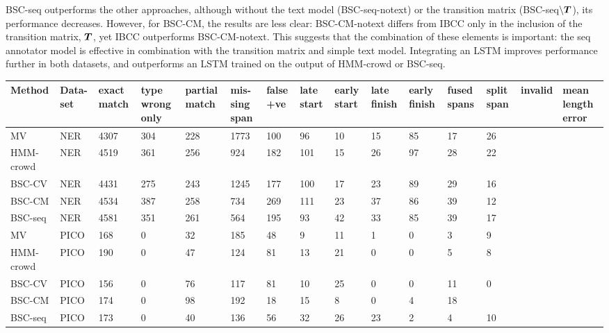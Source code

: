 BSC-seq outperforms the other approaches, although 
without the text model (BSC-seq-notext) or the transition matrix (BSC-seq$\backslash\boldsymbol T$),
its performance decreases.
However, for BSC-CM, the results are less clear: BSC-CM-notext differs from IBCC only in the 
inclusion of the transition matrix, $\boldsymbol T$, yet IBCC outperforms BSC-CM-notext.
This suggests that the combination of these elements is important: the seq annotator model is effective 
in combination with the transition matrix and simple text model.
Integrating an LSTM improves performance further in both datasets, and outperforms an LSTM trained on the output of HMM-crowd or BSC-seq.

\begin{table}[h]
\small
\begin{tabularx}{\textwidth}{l X X X X X X X X X X X X X X}
\toprule
Method & Data-set & exact match & type wrong only & partial match & mis-sing span & false +ve & late start & early start & late finish & early finish & fused spans & split span & invalid & mean length error\\ \midrule
MV & NER & 4307 & 304 & 228 & 1773 & 100 & 96 & 10 & 15 & 85 & 17 & 26 \\
HMM-crowd & NER & 4519 & 361 & 256 & 924 & 182 & 101 & 15 & 26 & 97 & 28 & 22 \\
BSC-CV & NER & 4431 & 275 & 243 & 1245 & 177 & 100 & 17 & 23 & 89 & 29 & 16 \\
BSC-CM & NER & 4534 & 387 & 258 & 734 & 269 & 111 & 23 & 37 & 86 & 39 & 12 \\
BSC-seq & NER & 4581 & 351 & 261 & 564 & 195 & 93 & 42 & 33 & 85 & 39 & 17 
\\
\midrule 
MV & PICO    & 168 & 0 & 32 & 185 & 48 & 9 & 11 & 1 & 0 & 3 & 9 \\
HMM-crowd    & PICO & 190 & 0 & 47 & 124 & 81 & 13 & 21 & 0 & 0 & 5 & 8 \\
BSC-CV       & PICO & 156 & 0 & 76 & 117 & 81 & 10 & 25 & 0 & 0 & 11 & 0 \\
BSC-CM       & PICO & 174 & 0 & 98 & 192 & 18 & 15 & 8  & 0 & 4 & 18 \\
BSC-seq      & PICO & 173 & 0 & 40 & 136 & 56 & 32 & 26 & 23 & 2 & 4 & 10\\

\end{tabularx}
\end{table}

